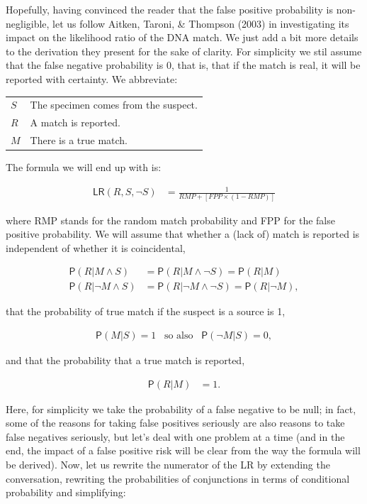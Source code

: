 \documentclass[10pt,dvipsnames,enabledeprecatedfontcommands]{scrartcl}
\newcommand{\n}{\neg}
\newcommand{\et}{\wedge}
\newcommand{\pr}[1]{\mathsf{P}(#1)}
\begin{document}
Hopefully, having convinced the reader that the false positive
probability is non-negligible, let us follow Aitken, Taroni, \& Thompson
(2003) in investigating its impact on the likelihood ratio of the DNA
match. We just add a bit more details to the derivation they present for
the sake of clarity. For simplicity we stil assume that the false
negative probability is 0, that is, that if the match is real, it will
be reported with certainty. We abbreviate:

\begin{center} \hspace{10mm}
\begin{tabular}{lp{9cm}}
$S$ & The specimen comes from the suspect. \\
$R$ & A match is reported. \\
$M$ & There is a true match.
\end{tabular}
\end{center}

The formula we will end up with is:

\begin{align}
\tag{FPP-LR} \mathsf{LR}(R, S, \n S) & = \frac{1}{RMP + [ FPP \times (1-RMP)]}
\end{align}

\noindent where RMP stands for the random match probability and FPP for
the false positive probability. We will assume that whether a (lack of)
match is reported is independent of whether it is coincidental,

\begin{align}
\label{eq:indOnS}
\pr{R \vert M \et S} & = \pr{R \vert M \et \n S} = \pr{R \vert M}
\\ \nonumber
\pr{R \vert \n M \et S} & = \pr{R \vert\n M \et \n S} = \pr{R \vert \n M},
\end{align}

\noindent  that the probability of true match if the suspect is a source
is 1,

\begin{align}
\label{eq:ifSthenM}
\pr{M\vert S} = 1  \,\,\, \mbox{ so also } \,\,\, \pr{\n M \vert S}=0,
\end{align}

\noindent and that the probability that a true match is reported,

\begin{align}
\label{eq:fnNull}
\pr{R \vert M} & = 1.
\end{align}

Here, for simplicity we take the probability of a false negative to be
null; in fact, some of the reasons for taking false positives seriously
are also reasons to take false negatives seriously, but let's deal with
one problem at a time (and in the end, the impact of a false positive
risk will be clear from the way the formula will be derived). Now, let
us rewrite the numerator of the LR by extending the conversation,
rewriting the probabilities of conjunctions in terms of conditional
probability and simplifying:
\end{document}
